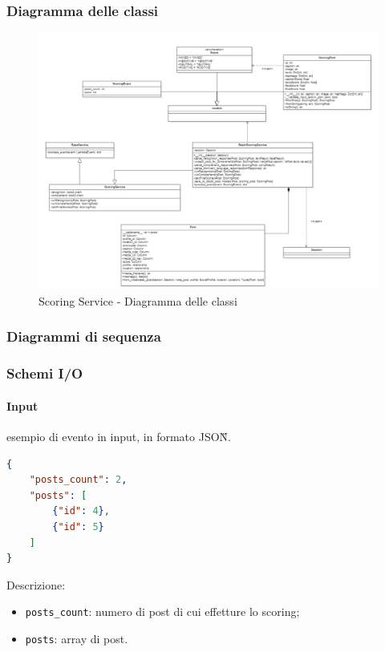 \subsubsection{Diagramma delle classi}
\begin{figure}[!h]
    \includegraphics[width=15cm]{sezioni/images/cd_scoring.png}
    \caption{Scoring Service - Diagramma delle classi}
\end{figure}
\subsubsection{Diagrammi di sequenza}

\subsubsection{Schemi I/O}
\paragraph*{Input} esempio di evento in input, in formato JSON\G{}.
\begin{lstlisting}[language=JSON]
{
    "posts_count": 2,
    "posts": [
        {"id": 4},
        {"id": 5}
    ]
}
\end{lstlisting}
Descrizione:
\begin{itemize}
    \item \verb|posts_count|: numero di post di cui effetture lo scoring;
    \item \verb|posts|: array di post. 
\end{itemize}

